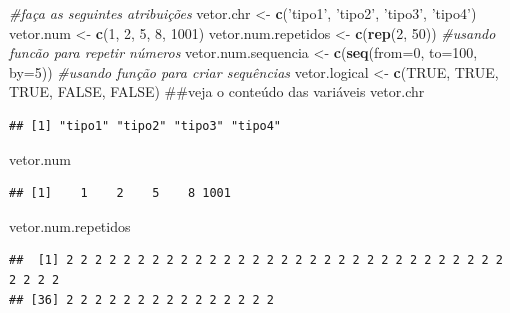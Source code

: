 \documentclass[]{book}
\newenvironment{Shaded}{\begin{snugshade}}{\end{snugshade}}
\newcommand{\KeywordTok}[1]{\textcolor[rgb]{0.13,0.29,0.53}{\textbf{#1}}}
\newcommand{\DataTypeTok}[1]{\textcolor[rgb]{0.13,0.29,0.53}{#1}}
\newcommand{\DecValTok}[1]{\textcolor[rgb]{0.00,0.00,0.81}{#1}}
\newcommand{\StringTok}[1]{\textcolor[rgb]{0.31,0.60,0.02}{#1}}
\newcommand{\CommentTok}[1]{\textcolor[rgb]{0.56,0.35,0.01}{\textit{#1}}}
\newcommand{\OtherTok}[1]{\textcolor[rgb]{0.56,0.35,0.01}{#1}}
\newcommand{\NormalTok}[1]{#1}
\begin{document}
\begin{Shaded}
\begin{Highlighting}[]
\CommentTok{#faça as seguintes atribuições}
\NormalTok{vetor.chr <-}\StringTok{ }\KeywordTok{c}\NormalTok{(}\StringTok{'tipo1'}\NormalTok{, }\StringTok{'tipo2'}\NormalTok{, }\StringTok{'tipo3'}\NormalTok{, }\StringTok{'tipo4'}\NormalTok{)}
\NormalTok{vetor.num <-}\StringTok{ }\KeywordTok{c}\NormalTok{(}\DecValTok{1}\NormalTok{, }\DecValTok{2}\NormalTok{, }\DecValTok{5}\NormalTok{, }\DecValTok{8}\NormalTok{, }\DecValTok{1001}\NormalTok{)}
\NormalTok{vetor.num.repetidos <-}\StringTok{ }\KeywordTok{c}\NormalTok{(}\KeywordTok{rep}\NormalTok{(}\DecValTok{2}\NormalTok{, }\DecValTok{50}\NormalTok{)) }\CommentTok{#usando funcão para repetir números}
\NormalTok{vetor.num.sequencia <-}\StringTok{ }\KeywordTok{c}\NormalTok{(}\KeywordTok{seq}\NormalTok{(}\DataTypeTok{from=}\DecValTok{0}\NormalTok{, }\DataTypeTok{to=}\DecValTok{100}\NormalTok{, }\DataTypeTok{by=}\DecValTok{5}\NormalTok{)) }\CommentTok{#usando função para criar sequências}
\NormalTok{vetor.logical <-}\StringTok{ }\KeywordTok{c}\NormalTok{(}\OtherTok{TRUE}\NormalTok{, }\OtherTok{TRUE}\NormalTok{, }\OtherTok{TRUE}\NormalTok{, }\OtherTok{FALSE}\NormalTok{, }\OtherTok{FALSE}\NormalTok{)}
\NormalTok{##veja o conteúdo das variáveis}
\NormalTok{vetor.chr}
\end{Highlighting}
\end{Shaded}

\begin{verbatim}
## [1] "tipo1" "tipo2" "tipo3" "tipo4"
\end{verbatim}

\begin{Shaded}
\begin{Highlighting}[]
\NormalTok{vetor.num}
\end{Highlighting}
\end{Shaded}

\begin{verbatim}
## [1]    1    2    5    8 1001
\end{verbatim}

\begin{Shaded}
\begin{Highlighting}[]
\NormalTok{vetor.num.repetidos}
\end{Highlighting}
\end{Shaded}

\begin{verbatim}
##  [1] 2 2 2 2 2 2 2 2 2 2 2 2 2 2 2 2 2 2 2 2 2 2 2 2 2 2 2 2 2 2 2 2 2 2 2
## [36] 2 2 2 2 2 2 2 2 2 2 2 2 2 2 2
\end{verbatim}
\end{document}

